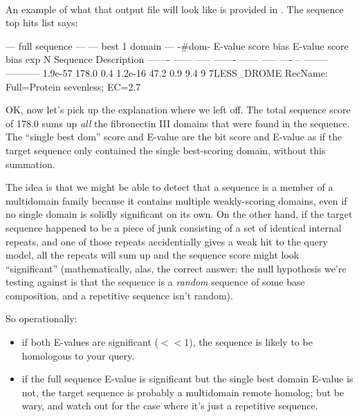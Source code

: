  \\

An example of what that output file will look like is provided in
. The sequence top hits list says:

\begin{samepage}
\begin{sreoutput}
   --- full sequence ---   --- best 1 domain ---    -#dom-
    E-value  score  bias    E-value  score  bias    exp  N  Sequence    Description
    ------- ------ -----    ------- ------ -----   ---- --  --------    -----------
    1.9e-57  178.0   0.4    1.2e-16   47.2   0.9    9.4  9  7LESS_DROME  RecName: Full=Protein sevenless;          EC=2.7
\end{sreoutput}
\end{samepage}

OK, now let's pick up the explanation where we left off. The total
sequence score of 178.0 sums up \emph{all} the fibronectin III domains
that were found in the  sequence. The ``single best
dom'' score and E-value are the bit score and E-value as if the target
sequence only contained the single best-scoring domain, without this
summation.

The idea is that we might be able to detect that a sequence is a
member of a multidomain family because it contains multiple
weakly-scoring domains, even if no single domain is solidly
significant on its own.  On the other hand, if the target sequence
happened to be a piece of junk consisting of a set of identical
internal repeats, and one of those repeats accidentially gives a weak
hit to the query model, all the repeats will sum up and the sequence
score might look ``significant'' (mathematically, alas, the
correct answer: the null hypothesis we're testing against is that the
sequence is a \emph{random} sequence of some base composition, and a
repetitive sequence isn't random).

So operationally:
\begin{itemize}
\item if both E-values are significant ($<<1$), the sequence is likely
      to be homologous to your query.
\item if the full sequence E-value is significant but the single best domain
      E-value is not, the target sequence is probably a multidomain remote 
      homolog; but be wary, and watch out for the case where it's just a repetitive
      sequence.
\end{itemize}

